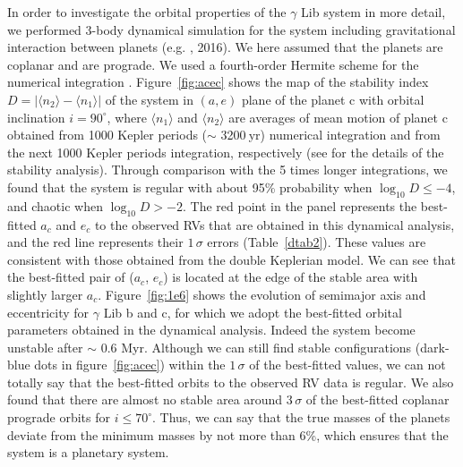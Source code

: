 \documentclass[]{pasj01}
\begin{document}
In order to investigate the orbital properties of the $\gamma$ Lib system in more detail, we performed 3-body dynamical simulation for the system including gravitational interaction between planets (e.g. \cite{Sato2013b}, 2016). 
We here assumed that the planets are coplanar and are prograde. 
We used a fourth-order Hermite scheme for the numerical integration \citep{kokubo:1998}.
Figure~\ref{fig:acec} shows the map of the stability index $D=|\langle n_2 \rangle -\langle n_1 \rangle |$ of the system in $(a, e)$ plane of the planet c with orbital inclination $i=90^{\circ}$, 
where $\langle n_1 \rangle$ and $\langle n_2 \rangle$ are averages of mean motion of planet c obtained from 1000 Kepler periods ($\sim$ 3200$\>$yr) numerical integration and from the next 1000 Kepler periods integration, respectively (see \cite{couetdic:2010} for the details of the stability analysis).
Through comparison with the 5 times longer integrations, we found that the system is regular with about 95\% probability when $\log_{10} D \le -4$, and chaotic when $\log_{10} D > -2$.
The red point in the panel represents the best-fitted $a_c$ and $e_c$ to the observed RVs that are obtained in this dynamical analysis, and the red line represents their $1\,\sigma$ errors (Table~\ref{dtab2}). 
These values are consistent with those obtained from the double Keplerian model. 
We can see that the best-fitted pair of ($a_c$, $e_c$) is located at the edge of the stable area with slightly larger $a_c$.
Figure~\ref{fig:1e6} shows the evolution of semimajor axis and eccentricity for $\gamma$ Lib b and c, for which we adopt the best-fitted orbital parameters obtained in the dynamical analysis.
Indeed the system become unstable after $\sim$ 0.6 Myr.
Although we can still find stable configurations (dark-blue dots in figure~\ref{fig:acec}) within the $1\,\sigma$ of the best-fitted values, we can not totally say that the best-fitted orbits to the observed RV data is regular.
We also found that there are almost no stable area around $3\,\sigma$ of the best-fitted coplanar prograde orbits for $i\le 70^{\circ}$. 
Thus, we can say that the true masses of the planets deviate from the minimum masses by not more than $6$\%, which ensures that the system is a planetary system.
\end{document}
